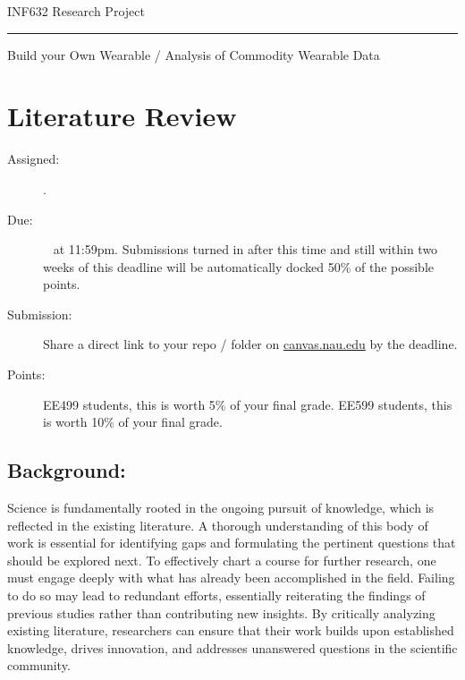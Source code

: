 \documentclass[11pt]{article}
\begin{document}


\Huge INF632 Research Project
\normalsize ~

\noindent\rule{\textwidth}{1pt}\vspace{.5em}

\LARGE Build your Own Wearable / Analysis of Commodity Wearable Data
\normalsize ~

\section{Literature Review}
\begin{description}
	\item [Assigned:] \wkFiveTu.
	\item [Due:] \wkSevenTu~ at 11:59pm. Submissions turned in after this time and still within two weeks of this deadline will be automatically docked 50\% of the possible points.
	\item [Submission:] Share a direct link to your repo / folder on \href{https://canvas.nau.edu}{canvas.nau.edu} by the deadline.
	\item [Points:] EE499 students, this is worth 5\% of your final grade.  EE599 students, this is worth 10\% of your final grade.
\end{description}

\subsection*{Background:}
Science is fundamentally rooted in the ongoing pursuit of knowledge, which is reflected in the existing literature. A thorough understanding of this body of work is essential for identifying gaps and formulating the pertinent questions that should be explored next. To effectively chart a course for further research, one must engage deeply with what has already been accomplished in the field. Failing to do so may lead to redundant efforts, essentially reiterating the findings of previous studies rather than contributing new insights. By critically analyzing existing literature, researchers can ensure that their work builds upon established knowledge, drives innovation, and addresses unanswered questions in the scientific community.
\end{document}
